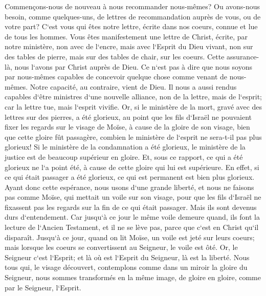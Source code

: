 \verse Commençons-nous de nouveau à nous recommander nous-mêmes? Ou avons-nous besoin, comme quelques-uns, de lettres de recommandation auprès de vous, ou de votre part? 
\verse C`est vous qui êtes notre lettre, écrite dans nos coeurs, connue et lue de tous les hommes. 
\verse Vous êtes manifestement une lettre de Christ, écrite, par notre ministère, non avec de l`encre, mais avec l`Esprit du Dieu vivant, non sur des tables de pierre, mais sur des tables de chair, sur les coeurs. 
\verse Cette assurance-là, nous l`avons par Christ auprès de Dieu. 
\verse Ce n`est pas à dire que nous soyons par nous-mêmes capables de concevoir quelque chose comme venant de nous-mêmes. Notre capacité, au contraire, vient de Dieu. 
\verse Il nous a aussi rendus capables d`être ministres d`une nouvelle alliance, non de la lettre, mais de l`esprit; car la lettre tue, mais l`esprit vivifie. 
\verse Or, si le ministère de la mort, gravé avec des lettres sur des pierres, a été glorieux, au point que les fils d`Israël ne pouvaient fixer les regards sur le visage de Moïse, à cause de la gloire de son visage, bien que cette gloire fût passagère, 
\verse combien le ministère de l`esprit ne sera-t-il pas plus glorieux! 
\verse Si le ministère de la condamnation a été glorieux, le ministère de la justice est de beaucoup supérieur en gloire. 
\verse Et, sous ce rapport, ce qui a été glorieux ne l`a point été, à cause de cette gloire qui lui est supérieure. 
\verse En effet, si ce qui était passager a été glorieux, ce qui est permanent est bien plus glorieux. 
\verse Ayant donc cette espérance, nous usons d`une grande liberté, 
\verse et nous ne faisons pas comme Moïse, qui mettait un voile sur son visage, pour que les fils d`Israël ne fixassent pas les regards sur la fin de ce qui était passager. 
\verse Mais ils sont devenus durs d`entendement. Car jusqu`à ce jour le même voile demeure quand, ils font la lecture de l`Ancien Testament, et il ne se lève pas, parce que c`est en Christ qu`il disparaît. 
\verse Jusqu`à ce jour, quand on lit Moïse, un voile est jeté sur leurs coeurs; 
\verse mais lorsque les coeurs se convertissent au Seigneur, le voile est ôté. 
\verse Or, le Seigneur c`est l`Esprit; et là où est l`Esprit du Seigneur, là est la liberté. 
\verse Nous tous qui, le visage découvert, contemplons comme dans un miroir la gloire du Seigneur, nous sommes transformés en la même image, de gloire en gloire, comme par le Seigneur, l`Esprit. 

\chapter{}

